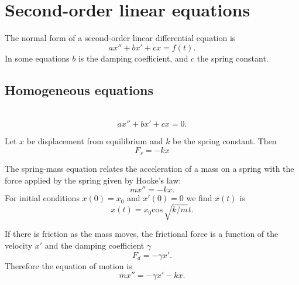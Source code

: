 \documentclass[nobib,notoc]{tufte-handout}
\begin{document}
\section{Second-order linear equations}
\begin{defi}
	The normal form of a second-order linear differential equation is
	\begin{equation*}
		ax''+bx'+cx=f(t).
	\end{equation*}
	In some equations \(b\) is the damping coefficient, and \(c\) the spring constant.
\end{defi}
\subsection{Homogeneous equations}
\begin{defi}
	\,
	\begin{equation}
		\label{homogen2}
		ax''+bx'+cx=0.
	\end{equation}
\end{defi}
\begin{defi}
	Let \(x\) be displacement from equilibrium and \(k\) be the spring constant. Then
	\begin{equation*}
		F_s=-kx
	\end{equation*}
\end{defi}
\begin{defi}
	The spring-mass equation relates the acceleration of a mass on a spring with the force applied by the spring given by Hooke's law:
	\begin{equation*}
		mx''=-kx.
	\end{equation*}
	For initial conditions \(x(0)=x_0\) and \(x'(0)=0\) we find \(x(t)\) is
	\begin{equation*}
		x(t)=x_0\text{cos}\,\sqrt{k/m}t.
	\end{equation*}
\end{defi}
\begin{defi}
	If there is friction as the mass moves, the frictional force is a function of the velocity \(x'\) and the damping coefficient \(\gamma\)
	\begin{equation*}
		F_d=-\gamma x'.
	\end{equation*}
	Therefore the equation of motion is
	\begin{equation*}
		mx''=-\gamma x'-kx.
	\end{equation*}
\end{defi}
\end{document}
